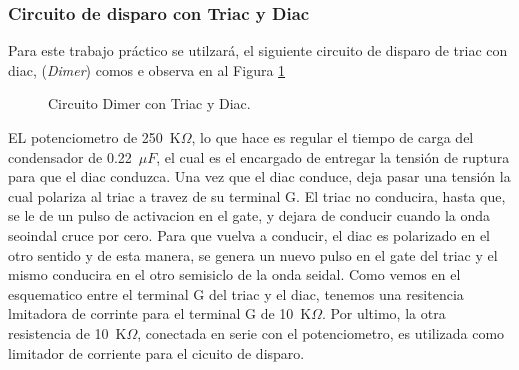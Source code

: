     \subsubsection{Circuito de disparo con Triac y Diac}
        
        Para este trabajo práctico se utilzará, el siguiente circuito de disparo 
        de triac con diac, (\textit{Dimer}) comos e observa en al Figura 
        \ref{fig:CircuitoTriacDiac}

        \begin{figure}[H]
            \centering
            \caption{Circuito Dimer con Triac y Diac.}
            \label{fig:CircuitoTriacDiac}
          \end{figure}

        EL potenciometro de 250~K\(\Omega\), lo que hace es regular el tiempo de carga del condensador 
        de 0.22~\(\mu F\), el cual es el encargado de entregar la tensión de ruptura para que el diac
        conduzca. Una vez que el diac conduce, deja pasar una tensión la cual polariza al triac
        a travez de su terminal G. El triac no conducira, hasta que, se le de un pulso de 
        activacion en el gate, y dejara de conducir cuando la onda seoindal cruce por cero.
        Para que vuelva a conducir, el diac es polarizado en el otro sentido y de esta manera, 
        se genera un nuevo pulso en el gate del triac y el mismo conducira en el otro semisiclo
        de la onda seidal. Como vemos en el esquematico entre el terminal G del triac y el diac, 
        tenemos una resitencia lmitadora de corrinte para el terminal G de 10~K\(\Omega\).
        Por ultimo, la otra resistencia de 10~K\(\Omega\), conectada en serie con el potenciometro, 
        es utilizada como limitador de corriente para el cicuito de disparo. 

